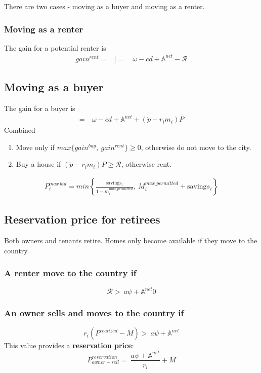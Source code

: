 There are two cases - moving as a buyer and moving as a renter.

\subsubsection{Moving as a renter}
The gain for a potential renter is 
\begin{align}
gain^{rent}=&]
=&\ \omega-cd+\mathbb{A}^{net}-\mathcal{R}
  \nonumber
\end{align}

\subsection{Moving as a buyer}
The gain for a buyer is 
\begin{align}
=&\ \omega-cd+\mathbb{A}^{net}+(\dot p-r_im_i)P   \nonumber
\end{align}
Combined
\begin{enumerate}
    \item Move only if $max\{gain^{buy},\ gain^{rent}\} \ge 0$, otherwise do not move to the city.
    
    \item Buy a house if $(\dot p-r_im_i)P\ge  \mathcal{R}$, otherwise rent.
\end{enumerate}

\begin{align}
P_i^{max\ bid}= min \left\{\frac{\mathrm{savings}_i}{1-m_i^{max\_permitted}},\  M_i^{max\_permitted} + \mathrm{saving}s_i  \right\}   \nonumber  
\end{align}


\subsection{Reservation price for retirees}
Both owners and tenants retire. Homes only become available if they move to the country. 
\subsubsection{A renter move to the country if} 
\[\mathcal{R} > \ a\psi+ \mathbb{A}^{net}0\]
\subsubsection{An owner sells and moves to the country if}
\[r_i(P^{realized}-M) >\ a\psi+ \mathbb{A}^{net}\]
This value provides a \textbf{reservation price}: 
\[P_{owner-sell}^{reservation} =\ \frac{a\psi+ \mathbb{A}^{net}}{r_i}+M \]

